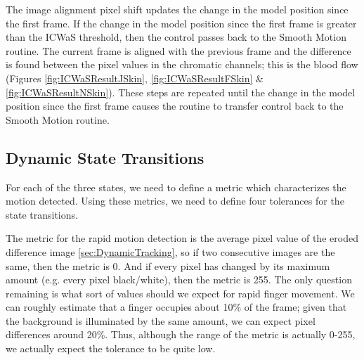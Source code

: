 The image alignment pixel shift updates the change in the model position since the first frame. If the change in the model position since the first frame is greater than the ICWaS threshold, then the control passes back to the Smooth Motion routine. The current frame is aligned with the previous frame and the difference is found between the pixel values in the chromatic channels; this is the blood flow (Figures  \ref{fig:ICWaSResultJSkin}, \ref{fig:ICWaSResultFSkin} \& \ref{fig:ICWaSResultNSkin}). These steps are repeated until the change in the model position since the first frame causes the routine to transfer control back to the Smooth Motion routine.

\clearpage

\subsection{Dynamic State Transitions}\label{sec:DynamicStateTransitions}
For each of the three states, we need to define a metric which characterizes the motion detected. Using these metrics, we need to define four tolerances for the state transitions.

The metric for the rapid motion detection is the average pixel value of the eroded difference image \ref{sec:DynamicTracking}, so if two consecutive images are the same, then the metric is 0. And if every pixel has changed by its maximum amount (e.g. every pixel black/white), then the metric is 255. The only question remaining is what sort of values should we expect for rapid finger movement. We can roughly estimate that a finger occupies about 10\% of the frame; given that the background is illuminated by the same amount, we can expect pixel differences around 20\%. Thus, although the range of the metric is actually 0-255, we actually expect the tolerance to be quite low.

